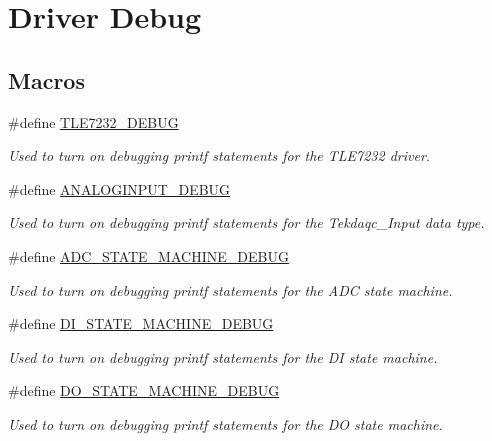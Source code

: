 \hypertarget{group__driver__debug}{\section{Driver Debug}
\label{group__driver__debug}
}
\subsection*{Macros}
\begin{DoxyCompactItemize}
\item 
\#define \hyperlink{group__driver__debug_gadcf668726728f32b959bd2f9e3fc1be3}{T\-L\-E7232\-\_\-\-D\-E\-B\-U\-G}
\begin{DoxyCompactList}\small\item\em Used to turn on debugging {\ttfamily printf} statements for the T\-L\-E7232 driver. \end{DoxyCompactList}\item 
\#define \hyperlink{group__driver__debug_gab86cc70e579e44fab34deffda6178284}{A\-N\-A\-L\-O\-G\-I\-N\-P\-U\-T\-\_\-\-D\-E\-B\-U\-G}
\begin{DoxyCompactList}\small\item\em Used to turn on debugging {\ttfamily printf} statements for the Tekdaqc\-\_\-\-Input data type. \end{DoxyCompactList}\item 
\#define \hyperlink{group__driver__debug_ga10ae9c17d0997dd17e63f7a2ae013d8b}{A\-D\-C\-\_\-\-S\-T\-A\-T\-E\-\_\-\-M\-A\-C\-H\-I\-N\-E\-\_\-\-D\-E\-B\-U\-G}
\begin{DoxyCompactList}\small\item\em Used to turn on debugging {\ttfamily printf} statements for the A\-D\-C state machine. \end{DoxyCompactList}\item 
\#define \hyperlink{group__driver__debug_ga0f9fe1cfc8284dbcc39720979952d04a}{D\-I\-\_\-\-S\-T\-A\-T\-E\-\_\-\-M\-A\-C\-H\-I\-N\-E\-\_\-\-D\-E\-B\-U\-G}
\begin{DoxyCompactList}\small\item\em Used to turn on debugging {\ttfamily printf} statements for the D\-I state machine. \end{DoxyCompactList}\item 
\#define \hyperlink{group__driver__debug_gafb8f6926e0b42224f3fce26156f278a3}{D\-O\-\_\-\-S\-T\-A\-T\-E\-\_\-\-M\-A\-C\-H\-I\-N\-E\-\_\-\-D\-E\-B\-U\-G}
\begin{DoxyCompactList}\small\item\em Used to turn on debugging {\ttfamily printf} statements for the D\-O state machine. \end{DoxyCompactList}\item 

\end{DoxyCompactItemize}
